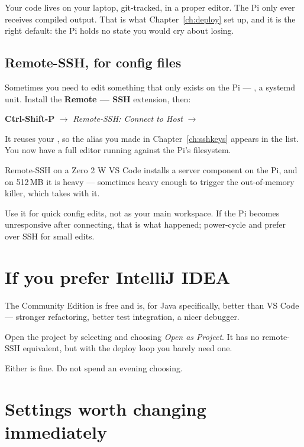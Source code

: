 Your code lives on your laptop, git-tracked, in a proper editor. The Pi only ever
receives compiled output. That is what Chapter~\ref{ch:deploy} set up, and it is
the right default: the Pi holds no state you would cry about losing.

\subsection{Remote-SSH, for config files}

Sometimes you need to edit something that only exists on the Pi ---
, a systemd unit. Install the \textbf{Remote --- SSH}
extension, then:

\textbf{Ctrl-Shift-P} $\rightarrow$ \emph{Remote-SSH: Connect to Host}
$\rightarrow$ 

It reuses your , so the alias you made in
Chapter~\ref{ch:sshkeys} appears in the list. You now have a full editor running
against the Pi's filesystem.

\begin{trap}{Remote-SSH on a Zero 2 W}
VS Code installs a server component on the Pi, and on 512\,MB it is heavy ---
sometimes heavy enough to trigger the out-of-memory killer, which takes
 with it.

Use it for quick config edits, not as your main workspace. If the Pi becomes
unresponsive after connecting, that is what happened; power-cycle and prefer
 over SSH for small edits.
\end{trap}

\section{If you prefer IntelliJ IDEA}

The Community Edition is free and is, for Java specifically, better than VS Code
--- stronger refactoring, better test integration, a nicer debugger.

Open the project by selecting  and choosing \emph{Open as
Project}. It has no remote-SSH equivalent, but with the deploy loop you barely
need one.

Either is fine. Do not spend an evening choosing.

\section{Settings worth changing immediately}

